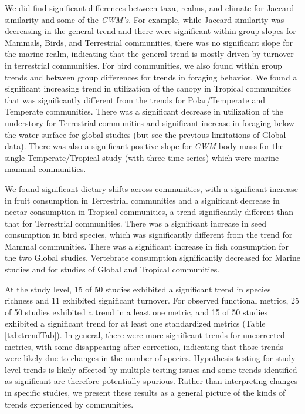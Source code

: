 \documentclass{article}
\begin{document}
We did find significant differences between taxa, realms, and climate
for Jaccard similarity and some of the \emph{CWM's}. For example, while
Jaccard similarity was decreasing in the general trend and there were
significant within group slopes for Mammals, Birds, and Terrestrial
communities, there was no significant slope for the marine realm,
indicating that the general trend is mostly driven by turnover in
terrestrial communities. For bird communities, we also found within
group trends and between group differences for trends in foraging
behavior. We found a significant increasing trend in utilization of the
canopy in Tropical communities that was significantly different from the
trends for Polar/Temperate and Temperate communities. There was a
significant decrease in utilization of the understory for Terrestrial
communities and significant increase in foraging below the water surface
for global studies (but see the previous limitations of Global data).
There was also a significant positive slope for \emph{CWM} body mass for
the single Temperate/Tropical study (with three time series) which were
marine mammal communities.

We found significant dietary shifts across communities, with a
significant increase in fruit consumption in Terrestrial communities and
a significant decrease in nectar consumption in Tropical communities, a
trend significantly different than that for Terrestrial communities.
There was a significant increase in seed consumption in bird species,
which was significantly different from the trend for Mammal communities.
There was a significant increase in fish consumption for the two Global
studies. Vertebrate consumption significantly decreased for Marine
studies and for studies of Global and Tropical communities.

At the study level, 15 of 50 studies exhibited a significant trend in
species richness and 11 exhibited significant turnover. For observed
functional metrics, 25 of 50 studies exhibited a trend in a least one
metric, and 15 of 50 studies exhibited a significant trend for at least
one standardized metrics (Table \ref{tab:trendTab}). In general, there
were more significant trends for uncorrected metrics, with some
disappearing after correction, indicating that those trends were likely
due to changes in the number of species. Hypothesis testing for
study-level trends is likely affected by multiple testing issues and
some trends identified as significant are therefore potentially
spurious. Rather than interpreting changes in specific studies, we
present these results as a general picture of the kinds of trends
experienced by communities.
\end{document}
